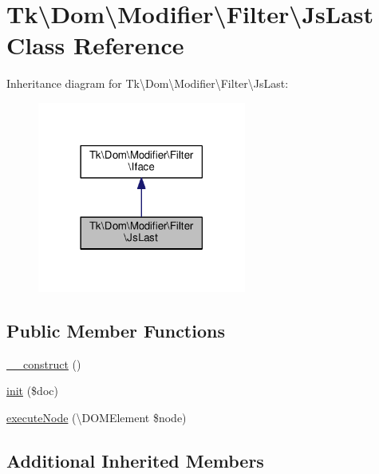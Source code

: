 \hypertarget{classTk_1_1Dom_1_1Modifier_1_1Filter_1_1JsLast}{\section{Tk\textbackslash{}Dom\textbackslash{}Modifier\textbackslash{}Filter\textbackslash{}Js\+Last Class Reference}
\label{classTk_1_1Dom_1_1Modifier_1_1Filter_1_1JsLast}
}


Inheritance diagram for Tk\textbackslash{}Dom\textbackslash{}Modifier\textbackslash{}Filter\textbackslash{}Js\+Last\+:\nopagebreak
\begin{figure}[H]
\begin{center}
\leavevmode
\includegraphics[width=194pt]{classTk_1_1Dom_1_1Modifier_1_1Filter_1_1JsLast__inherit__graph}
\end{center}
\end{figure}
\subsection*{Public Member Functions}
\begin{DoxyCompactItemize}
\item 
\hyperlink{classTk_1_1Dom_1_1Modifier_1_1Filter_1_1JsLast_a7b4025c8a8312c3344531d6fba124182}{\+\_\+\+\_\+construct} ()
\item 
\hyperlink{classTk_1_1Dom_1_1Modifier_1_1Filter_1_1JsLast_aca1e9d428623865e5841caddd5031318}{init} (\$doc)
\item 
\hyperlink{classTk_1_1Dom_1_1Modifier_1_1Filter_1_1JsLast_a1cda5e86f0f3db1879f3b5439740227b}{execute\+Node} (\textbackslash{}D\+O\+M\+Element \$node)
\end{DoxyCompactItemize}
\subsection*{Additional Inherited Members}


